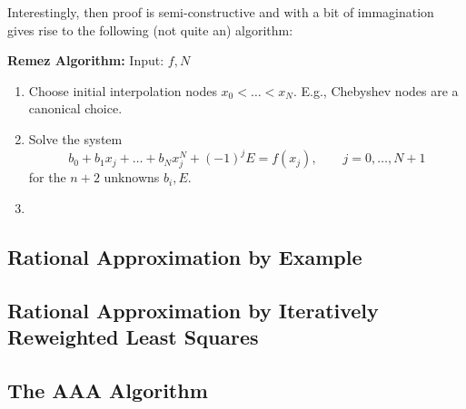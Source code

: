 Interestingly, then proof is semi-constructive and with a bit of immagination
gives rise to the following (not quite an) algorithm:

{\bf Remez Algorithm:} Input: $f, N$
\begin{enumerate}
\item Choose initial interpolation nodes $x_0 < \dots < x_N$. E.g., Chebyshev
nodes are a canonical choice.
\item Solve the system
\[
      b_0 + b_1 x_j + \dots + b_{N} x_{j}^{N} + (-1)^j E = f(x_j),
      \qquad j = 0, \dots, N+1
\]
for the $n+2$ unknowns $b_i, E$.
\item
\end{enumerate}



\subsection{Rational Approximation by Example}





\subsection{Rational Approximation by Iteratively Reweighted Least Squares}


\subsection{The AAA Algorithm}
